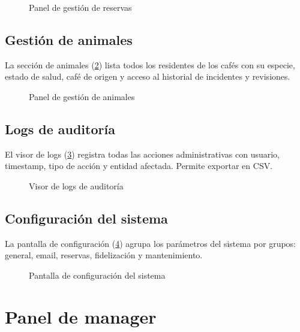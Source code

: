 \documentclass[12pt,a4paper,twoside,openright]{report}
\begin{document}
\begin{figure}[H]
  \centering
  \fbox{\rule{0pt}{6cm}\rule{12cm}{0pt}}
  \caption{Panel de gestión de reservas}
  \label{fig:34-admin-reservas}
\end{figure}

\subsection{Gestión de animales}
La sección de animales (\cref{fig:35-admin-animales}) lista todos los residentes
de los cafés con su especie, estado de salud, café de origen y acceso al historial
de incidentes y revisiones.

\begin{figure}[H]
  \centering
  \fbox{\rule{0pt}{6cm}\rule{12cm}{0pt}}
  \caption{Panel de gestión de animales}
  \label{fig:35-admin-animales}
\end{figure}

\subsection{Logs de auditoría}
El visor de logs (\cref{fig:41-admin-logs-auditoria}) registra todas las acciones
administrativas con usuario, timestamp, tipo de acción y entidad afectada.
Permite exportar en CSV.

\begin{figure}[H]
  \centering
  \fbox{\rule{0pt}{6cm}\rule{12cm}{0pt}}
  \caption{Visor de logs de auditoría}
  \label{fig:41-admin-logs-auditoria}
\end{figure}

\subsection{Configuración del sistema}
La pantalla de configuración (\cref{fig:40-admin-settings}) agrupa los parámetros
del sistema por grupos: general, email, reservas, fidelización y mantenimiento.

\begin{figure}[H]
  \centering
  \fbox{\rule{0pt}{6cm}\rule{12cm}{0pt}}
  \caption{Pantalla de configuración del sistema}
  \label{fig:40-admin-settings}
\end{figure}

\section{Panel de manager}
\label{sec:manual-manager}
\end{document}
